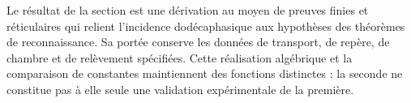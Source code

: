 Le résultat de la section est une dérivation au moyen de preuves finies et réticulaires qui relient l'incidence dodécaphasique aux hypothèses des théorèmes de reconnaissance. Sa portée conserve les données de transport, de repère, de chambre et de relèvement spécifiées. Cette réalisation algébrique et la comparaison de constantes maintiennent des fonctions distinctes : la seconde ne constitue pas à elle seule une validation expérimentale de la première.
